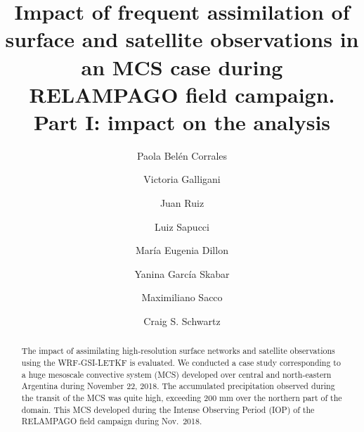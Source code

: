 \documentclass[final,5p,times,twocolumn,authoryear]{elsarticle} %
\begin{document}
\begin{frontmatter}

  \title{Impact of frequent assimilation of surface and satellite observations in an MCS case during RELAMPAGO field campaign. Part I: impact on the analysis}
    \author[UBA,CIMA,CNRS]{Paola Belén Corrales}
    \author[UBA,CIMA,CNRS]{Victoria Galligani}
  
    \author[UBA,CIMA,CNRS]{Juan Ruiz}
  
    \author[INPE]{Luiz Sapucci}
  
    \author[SMN,CONICET]{María Eugenia Dillon}
  
    \author[SMN,CONICET,CNRS]{Yanina García Skabar}
  
    \author[SMN]{Maximiliano Sacco}
  
    \author[NCAR]{Craig S. Schwartz}
  
      \address[UBA]{Universidad de Buenos Aires, Facultad de Ciencias Exactas y Naturales, Departamento de Ciencias de la Atmósfera y los Océanos. Buenos Aires, Argentina.}
    \address[CIMA]{CONICET -- Universidad de Buenos Aires. Centro de Investigaciones del Mar y la Atmósfera (CIMA). Buenos Aires, Argentina.}
    \address[CNRS]{CNRS -- IRD -- CONICET -- UBA. Instituto Franco-Argentino para el Estudio del Clima y sus Impactos (IRL 3351 IFAECI). Buenos Aires, Argentina.}
    \address[SMN]{Servicio Meteorológico Nacional de Argentina.}
    \address[CONICET]{CONICET (Consejo Nacional de Investigaciones Científicas y Técnicas).}
    \address[INPE]{National Institute for Space Research, Brazil, Center for Weather Forecasting and Climate Studies.}
    \address[NCAR]{National Center for Atmospheric Research, Boulder, Colorado.}
  
  \begin{abstract}
  The impact of assimilating high-resolution surface networks and satellite observations using the WRF-GSI-LETKF is evaluated. We conducted a case study corresponding to a huge mesoscale convective system (MCS) developed over central and north-eastern Argentina during November 22, 2018. The accumulated precipitation observed during the transit of the MCS was quite high, exceeding 200 mm over the northern part of the domain. This MCS developed during the Intense Observing Period (IOP) of the RELAMPAGO field campaign during Nov.~2018.
  

\end{abstract}
\end{frontmatter}
\end{document}
